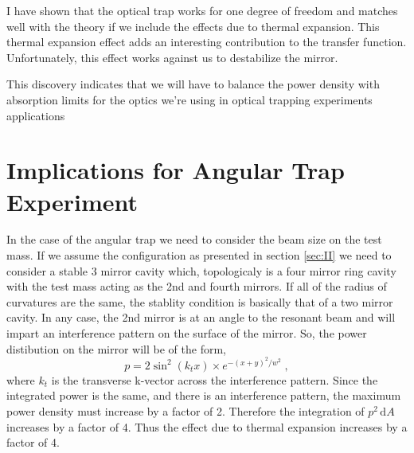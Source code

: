 \acresetall

I have shown that the optical trap works for one degree of freedom and
matches well with the theory if we include the effects due to thermal
expansion.
This thermal expansion effect adds an interesting contribution to the transfer
function. Unfortunately, this effect works against us to destabilize the mirror.

This discovery indicates that we will have to balance the power density with
absorption limits for the optics we're using in optical trapping experiments
applications

\section{Implications for Angular Trap Experiment}
In the case of the angular trap we need to consider the beam size on the
test mass.
If we assume the configuration as presented in section \ref{sec:II} we
need to consider a stable 3 mirror cavity which, topologicaly is a four
mirror ring cavity with the test mass acting as the 2nd and fourth mirrors.
If all of the radius of curvatures are the same, the stablity condition is
basically that of a two mirror cavity.
In any case, the 2nd mirror is at an angle to the resonant beam and will
impart an interference pattern on the surface of the mirror.
So, the power distibution on the mirror will be of the form,
\begin{equation}
p = 2 \sin^2(k_t x) \times e^{-(x+y)^2/w^2 } \;,
\end{equation}
where $k_t$ is the transverse k-vector across the interference pattern.
Since the integrated power is the same, and there is an interference pattern,
the maximum power density must increase by a factor of 2.
Therefore the integration of $p^2 \, \mathrm{d}A$ increases by a factor of 4.
Thus the effect due to thermal expansion increases by a factor of 4.


